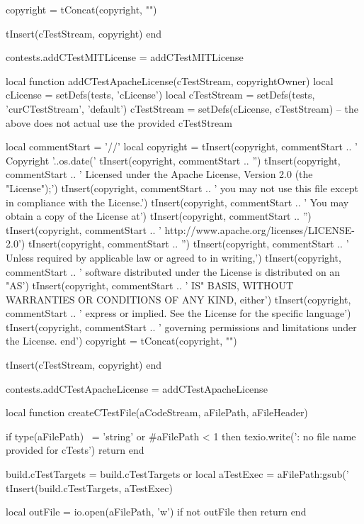   copyright = tConcat(copyright, "\n")

  tInsert(cTestStream, copyright)
end

contests.addCTestMITLicense = addCTestMITLicense

local function addCTestApacheLicense(cTestStream, copyrightOwner)
  local cLicense       = setDefs(tests, 'cLicense')
  local cTestStream    = setDefs(tests, 'curCTestStream', 'default')
  cTestStream          = setDefs(cLicense, cTestStream)
  -- the above does not actual use the provided cTestStream

  local  commentStart = '//'
  local  copyright = { }
  tInsert(copyright, commentStart ..
    ' Copyright '..os.date('%
  tInsert(copyright,  commentStart .. 
    '')
  tInsert(copyright, commentStart ..
    ' Licensed under the Apache License, Version 2.0 (the "License");')
  tInsert(copyright, commentStart ..
    ' you may not use this file except in compliance with the License.')
  tInsert(copyright, commentStart ..
    ' You may obtain a copy of the License at')
  tInsert(copyright, commentStart ..
    '')
  tInsert(copyright, commentStart ..
    '    http://www.apache.org/licenses/LICENSE-2.0')
  tInsert(copyright, commentStart ..
    '')
  tInsert(copyright, commentStart ..
    ' Unless required by applicable law or agreed to in writing,')
  tInsert(copyright, commentStart ..
    ' software distributed under the License is distributed on an "AS')
  tInsert(copyright, commentStart ..
    ' IS" BASIS, WITHOUT WARRANTIES OR CONDITIONS OF ANY KIND, either')
  tInsert(copyright, commentStart ..
    ' express or implied. See the License for the specific language')
  tInsert(copyright, commentStart ..
    ' governing permissions and limitations under the License. end')
  copyright = tConcat(copyright, "\n")

  tInsert(cTestStream, copyright)
end

contests.addCTestApacheLicense = addCTestApacheLicense


local function createCTestFile(aCodeStream, aFilePath, aFileHeader)

  if type(aFilePath) ~= 'string'
    or #aFilePath < 1 then
    texio.write('\nERROR: no file name provided for cTests\n\n')
    return
  end

  build.cTestTargets = build.cTestTargets or { }
  local aTestExec = aFilePath:gsub('%
  tInsert(build.cTestTargets, aTestExec)

  local outFile = io.open(aFilePath, 'w')
  if not outFile then
    return
  end

